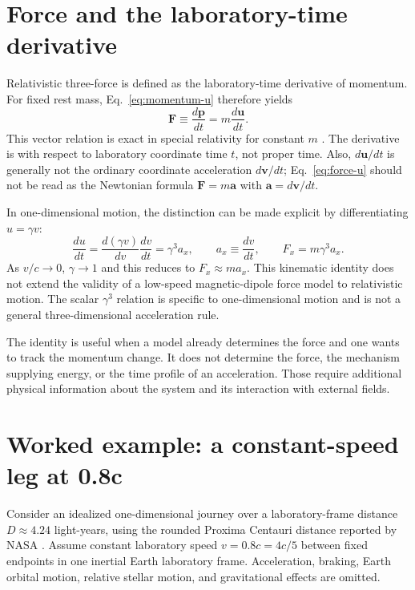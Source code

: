 \documentclass[12pt]{article}
\begin{document}
\section{Force and the laboratory-time derivative}
\label{sec:force}

Relativistic three-force is defined as the laboratory-time derivative of momentum. For fixed rest mass, Eq.~\eqref{eq:momentum-u} therefore yields
\begin{equation}
  \mathbf F\equiv\frac{d\mathbf p}{dt}
  =m\frac{d\mathbf u}{dt}.
  \label{eq:force-u}
\end{equation}
This vector relation is exact in special relativity for constant $m$ \cite{Tong}. The derivative is with respect to laboratory coordinate time $t$, not proper time. Also, $d\mathbf u/dt$ is generally not the ordinary coordinate acceleration $d\mathbf v/dt$; Eq.~\eqref{eq:force-u} should not be read as the Newtonian formula $\mathbf F=m\mathbf a$ with $\mathbf a=d\mathbf v/dt$.

In one-dimensional motion, the distinction can be made explicit by differentiating $u=\gamma v$:
\begin{equation}
  \frac{du}{dt}
  =\frac{d(\gamma v)}{dv}\frac{dv}{dt}
  =\gamma^3 a_x,
  \qquad
  a_x\equiv\frac{dv}{dt},
  \qquad
  F_x=m\gamma^3a_x.
  \label{eq:longitudinal-force}
\end{equation}
As $v/c\to0$, $\gamma\to1$ and this reduces to $F_x\approx ma_x$. This kinematic identity does not extend the validity of a low-speed magnetic-dipole force model to relativistic motion. The scalar $\gamma^3$ relation is specific to one-dimensional motion and is not a general three-dimensional acceleration rule.

The identity is useful when a model already determines the force and one wants to track the momentum change. It does not determine the force, the mechanism supplying energy, or the time profile of an acceleration. Those require additional physical information about the system and its interaction with external fields.

\section{Worked example: a constant-speed leg at 0.8c}
\label{sec:proxima}

Consider an idealized one-dimensional journey over a laboratory-frame distance $D\approx4.24$ light-years, using the rounded Proxima Centauri distance reported by NASA \cite{NASAProxima}. Assume constant laboratory speed $v=0.8c=4c/5$ between fixed endpoints in one inertial Earth laboratory frame. Acceleration, braking, Earth orbital motion, relative stellar motion, and gravitational effects are omitted.
\end{document}
